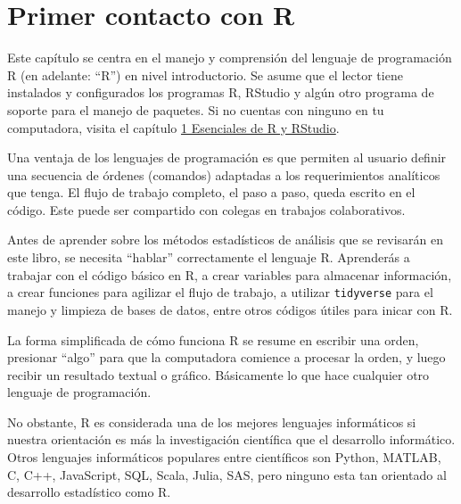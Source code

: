 \documentclass[
]{article}
\theoremstyle{definition}
\theoremstyle{definition}
\theoremstyle{definition}
\theoremstyle{definition}
\theoremstyle{remark}
\begin{document}
\hypertarget{rbasico}{%
\section{\texorpdfstring{\textbf{Primer contacto con R}}{Primer contacto con R}}\label{rbasico}}

Este capítulo se centra en el manejo y comprensión del lenguaje de programación R (en adelante: ``R'') en nivel introductorio. Se asume que el lector tiene instalados y configurados los programas R, RStudio y algún otro programa de soporte para el manejo de paquetes. Si no cuentas con ninguno en tu computadora, visita el capítulo \protect\hyperlink{esencialesRRStudio}{1 Esenciales de R y RStudio}.

Una ventaja de los lenguajes de programación es que permiten al usuario definir una secuencia de órdenes (comandos) adaptadas a los requerimientos analíticos que tenga. El flujo de trabajo completo, el paso a paso, queda escrito en el código. Este puede ser compartido con colegas en trabajos colaborativos.

Antes de aprender sobre los métodos estadísticos de análisis que se revisarán en este libro, se necesita ``hablar'' correctamente el lenguaje R. Aprenderás a trabajar con el código básico en R, a crear variables para almacenar información, a crear funciones para agilizar el flujo de trabajo, a utilizar \texttt{tidyverse} para el manejo y limpieza de bases de datos, entre otros códigos útiles para inicar con R.

La forma simplificada de cómo funciona R se resume en escribir una orden, presionar ``algo'' para que la computadora comience a procesar la orden, y luego recibir un resultado textual o gráfico. Básicamente lo que hace cualquier otro lenguaje de programación.

No obstante, R es considerada una de los mejores lenguajes informáticos si nuestra orientación es más la investigación científica que el desarrollo informático. Otros lenguajes informáticos populares entre científicos son Python, MATLAB, C, C++, JavaScript, SQL, Scala, Julia, SAS, pero ninguno esta tan orientado al desarrollo estadístico como R.
\end{document}
